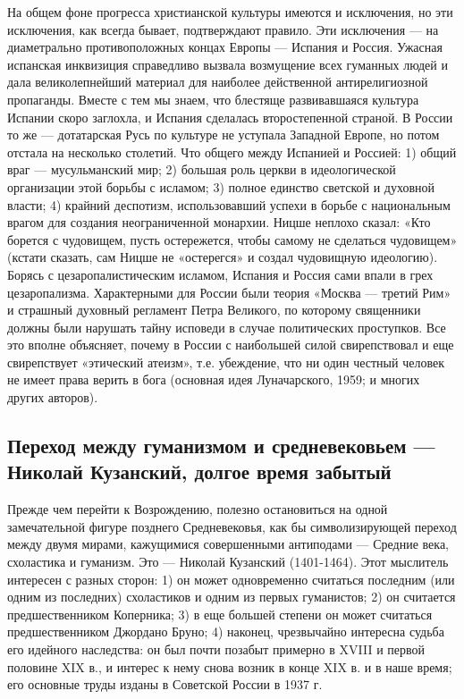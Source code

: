 На общем фоне прогресса христианской культуры имеются и исключения, но
эти исключения, как всегда бывает, подтверждают правило. Эти
исключения --- на диаметрально противоположных концах Европы ---
Испания и Россия. Ужасная испанская инквизиция справедливо вызвала
возмущение всех гуманных людей и дала великолепнейший материал для
наиболее действенной антирелигиозной пропаганды. Вместе с тем мы
знаем, что блестяще развивавшаяся культура Испании скоро заглохла, и
Испания сделалась второстепенной страной. В России то же ---
дотатарская Русь по культуре не уступала Западной Европе, но потом
отстала на несколько столетий. Что общего между Испанией и Россией: 1)
общий враг --- мусульманский мир; 2) большая роль церкви в
идеологической организации этой борьбы с исламом; 3) полное единство
светской и духовной власти; 4) крайний деспотизм, использовавший
успехи в борьбе с национальным врагом для создания неограниченной
монархии. Ницше неплохо сказал: «Кто борется с чудовищем, пусть
остережется, чтобы самому не сделаться чудовищем» (кстати сказать, сам
Ницше не «остерегся» и создал чудовищную идеологию). Борясь с
цезаропалистическим исламом, Испания и Россия сами впали в грех
цезаропализма. Характерными для России были теория «Москва --- третий
Рим» и страшный духовный регламент Петра Великого, по которому
священники должны были нарушать тайну исповеди в случае политических
проступков. Все это вполне объясняет, почему в России с наибольшей
силой свирепствовал и еще свирепствует «этический атеизм», т.е.
убеждение, что ни один честный человек не имеет права верить в бога
(основная идея Луначарского, 1959; и многих других авторов).

\subsection{Переход между гуманизмом и средневековьем --- Николай
Кузанский, долгое время забытый}

Прежде чем перейти к Возрождению, полезно остановиться на одной
замечательной фигуре позднего Средневековья, как бы символизирующей
переход между двумя мирами, кажущимися совершенными антиподами ---
Средние века, схоластика и гуманизм. Это --- Николай Кузанский
(1401-1464). Этот мыслитель интересен с разных сторон: 1) он может
одновременно считаться последним (или одним из последних) схоластиков
и одним из первых гуманистов; 2) он считается предшественником
Коперника; 3) в еще большей степени он может считаться
предшественником Джордано Бруно; 4) наконец, чрезвычайно интересна
судьба его идейного наследства: он был почти позабыт примерно в XVIII
и первой половине XIX в., и интерес к нему снова возник в конце XIX в.
и в наше время; его основные труды изданы в Советской России в 1937 г.

